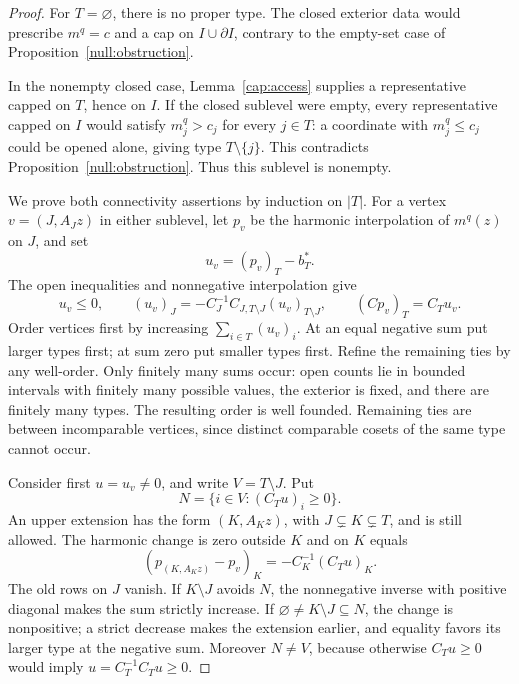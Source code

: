 \begin{proof}
For \(T=\varnothing\), there is no proper type.  The closed exterior
data would prescribe \(m^q=c\) and a cap on \(I\cup\partial I\), contrary
to the empty-set case of Proposition~\ref{null:obstruction}.

In the nonempty closed case, Lemma~\ref{cap:access} supplies a
representative capped on \(T\), hence on \(I\).  If the closed sublevel
were empty, every representative capped on \(I\) would satisfy
\(m_j^q>c_j\) for every \(j\in T\): a coordinate with \(m_j^q\le c_j\)
could be opened alone, giving type \(T\setminus\{j\}\).
This contradicts Proposition~\ref{null:obstruction}.  Thus this sublevel
is nonempty.

We prove both connectivity assertions by induction on \(|T|\).
For a vertex \(v=(J,A_Jz)\) in either sublevel, let \(p_v\) be the
harmonic interpolation of \(m^q(z)\) on \(J\), and set
\[
 u_v=(p_v)_T-b_T^*.
\]
The open inequalities and nonnegative interpolation give
\begin{equation}
 u_v\le0,\qquad
 (u_v)_J=-C_J^{-1}C_{J,T\setminus J}(u_v)_{T\setminus J},
 \qquad (Cp_v)_T=C_Tu_v.
 \label{ht:local-difference}
\end{equation}
Order vertices first by increasing \(\sum_{i\in T}(u_v)_i\).
At an equal negative sum put larger types first; at sum zero put
smaller types first.  Refine the remaining ties by any well-order.
Only finitely many sums occur: open counts lie in bounded intervals
with finitely many possible values, the exterior is fixed, and there
are finitely many types.  The resulting order is well founded.
Remaining ties are between incomparable vertices, since distinct
comparable cosets of the same type cannot occur.

Consider first \(u=u_v\ne0\), and write \(V=T\setminus J\).  Put
\[
 N=\{i\in V:(C_Tu)_i\ge0\}.
\]
An upper extension has the form \((K,A_Kz)\), with
\(J\subsetneq K\subsetneq T\), and is still allowed.  The harmonic
change is zero outside \(K\) and on \(K\) equals
\begin{equation}
 (p_{(K,A_Kz)}-p_v)_K=-C_K^{-1}(C_Tu)_K.
 \label{ht:local-upper-change}
\end{equation}
The old rows on \(J\) vanish.  If \(K\setminus J\) avoids \(N\),
the nonnegative inverse with positive diagonal makes the sum strictly
increase.  If \(\varnothing\ne K\setminus J\subseteq N\), the change
is nonpositive; a strict decrease makes the extension earlier, and
equality favors its larger type at the negative sum.
Moreover \(N\ne V\), because otherwise \(C_Tu\ge0\) would imply
\(u=C_T^{-1}C_Tu\ge0\).


\end{proof}
